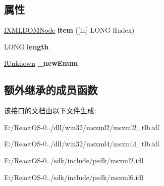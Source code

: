 \subsection*{属性}
\begin{DoxyCompactItemize}
\item 
\mbox{\label{interface_m_s_x_m_l2_1_1_i_x_m_l_d_o_m_node_list_a47cefee6db6d5f4b80846ac36ff5e800}} 
\hyperlink{interface_m_s_x_m_l2_1_1_i_x_m_l_d_o_m_node}{I\+X\+M\+L\+D\+O\+M\+Node} {\bfseries item} (\mbox{[}in\mbox{]} L\+O\+NG l\+Index)
\item 
\mbox{\label{interface_m_s_x_m_l2_1_1_i_x_m_l_d_o_m_node_list_ae2dab1aad930642ae87dc3b5b95e57cb}} 
L\+O\+NG {\bfseries length}
\item 
\mbox{\label{interface_m_s_x_m_l2_1_1_i_x_m_l_d_o_m_node_list_a7136df66080341b243dc39fb84eba1f2}} 
\hyperlink{interface_i_unknown}{I\+Unknown} {\bfseries \+\_\+new\+Enum}
\end{DoxyCompactItemize}
\subsection*{额外继承的成员函数}


该接口的文档由以下文件生成\+:\begin{DoxyCompactItemize}
\item 
E\+:/\+React\+O\+S-\/0../dll/win32/msxml2/msxml2\+\_\+tlb.\+idl\item 
E\+:/\+React\+O\+S-\/0../dll/win32/msxml4/msxml4\+\_\+tlb.\+idl\item 
E\+:/\+React\+O\+S-\/0../sdk/include/psdk/msxml2.\+idl\item 
E\+:/\+React\+O\+S-\/0../sdk/include/psdk/msxml6.\+idl\end{DoxyCompactItemize}
